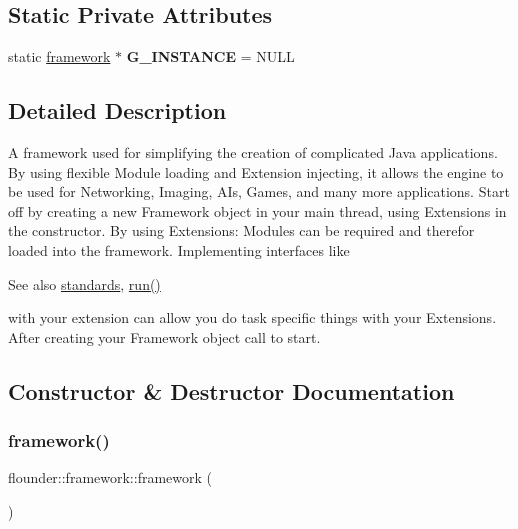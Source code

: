 \subsection*{Static Private Attributes}
\begin{DoxyCompactItemize}
\item 
\mbox{\label{classflounder_1_1framework_a896bceb89f218cbfc92592b1c24929e9}} 
static \hyperlink{classflounder_1_1framework}{framework} $\ast$ {\bfseries G\+\_\+\+I\+N\+S\+T\+A\+N\+CE} = N\+U\+LL
\end{DoxyCompactItemize}


\subsection{Detailed Description}
A framework used for simplifying the creation of complicated Java applications. By using flexible Module loading and Extension injecting, it allows the engine to be used for Networking, Imaging, A\+Is, Games, and many more applications. Start off by creating a new Framework object in your main thread, using Extensions in the constructor. By using Extensions\+: Modules can be required and therefor loaded into the framework. Implementing interfaces like \begin{DoxySeeAlso}{See also}
\hyperlink{classflounder_1_1standards}{standards}, \hyperlink{classflounder_1_1framework_aa3a73c8e8f5f0c6ccef3e4de89982434}{run()}


\end{DoxySeeAlso}
with your extension can allow you do task specific things with your Extensions. After creating your Framework object call  to start. 



\subsection{Constructor \& Destructor Documentation}
\mbox{\label{classflounder_1_1framework_ae7f076f63f78093952477e83174120f9}} 
\subsubsection{\texorpdfstring{framework()}{framework()}}
{\footnotesize\ttfamily flounder\+::framework\+::framework (\begin{DoxyParamCaption}{ }\end{DoxyParamCaption})}



